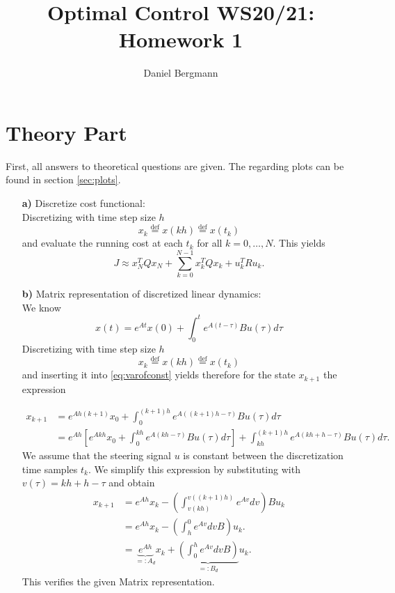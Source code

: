 \documentclass[]{article}
\title{Optimal Control WS20/21: Homework 1}
\author{Daniel Bergmann}
\newcommand{\trp}{^T}
\newcommand{\xnull}{x_0}
\newcommand{\xN}{x_N}
\newcommand{\xk}{x_k}
\newcommand{\uk}{u_k}
\newcommand{\Ad}{A_d}
\newcommand{\Bd}{B_d}
\newcommand{\xkplus}{x_{k+1}}
\newcommand{\tk}{t_{k}}
\begin{document}
\maketitle

\section{Theory Part}
First, all answers to theoretical questions are given. The regarding plots can be found in section \ref{sec:plots}.
\begin{enumerate}
	\item[\bf a)] Discretize cost functional:\\
		Discretizing  with time step size $ h $ \[ \xk \overset{\mathrm{def}}{=} x(kh) \overset{\mathrm{def}}{=} x(t_k) \] and evaluate the running cost at each $ t_k $ for all $ k = 0,\dots,N $. This yields
	 	\begin{equation}
			 J \approx  \xN\trp Q \xN + \sum_{k = 0}^{N-1} \xk \trp Q \xk + \uk\trp R \uk.
	 	\end{equation}
		
	\item[\bf b)] Matrix representation of discretized linear dynamics:\\
	
	We know
	\begin{equation}
		x(t) = e^{At} x(0) + \int_{0}^{t} e^{A(t-\tau)} B u(\tau) d\tau \label{eq:varofconst}
	\end{equation}
		Discretizing  with time step size $ h $ \[ \xk \overset{\mathrm{def}}{=} x(kh) \overset{\mathrm{def}}{=} x(t_k) \] and inserting it into  \eqref{eq:varofconst} yields therefore for the state $ \xkplus $ the expression
		
		\begin{align}
			\xkplus &= e^{Ah(k+1)} \xnull + \int_{0}^{(k+1)h} e^{A((k+1)h-\tau)} Bu(\tau) d\tau\\
					&= e^{Ah}\left[ e^{Akh}\xnull + \int_{0}^{kh} e^{A(kh-\tau)}Bu(\tau) d\tau\right] + \int_{kh}^{(k+1)h} e^{A(kh+h-\tau)}Bu(\tau) d\tau.
		\end{align}
		We assume that the steering signal $ u $ is constant between the discretization time samples $ \tk. $
		We simplify this expression  by substituting with $ v(\tau) = kh + h - \tau $ and obtain
		\begin{align}
			\xkplus &= e^{Ah}\xk - \left( \int_{v(kh)}^{v((k+1)h)} e^{Av} dv \right) B\uk\\
			&= e^{Ah}\xk - \left(\int_{h}^{0} e^{Av} dv B \right) \uk.\\
					&= \underbrace{e^{Ah}}_{=:\Ad}\xk + \underbrace{\left(\int_{0}^{h} e^{Av} dv B \right)}_{=:\Bd}   \uk. \label{eq:exactdiscr}
		\end{align}
		This verifies the given Matrix representation.


\end{enumerate}
\end{document}
